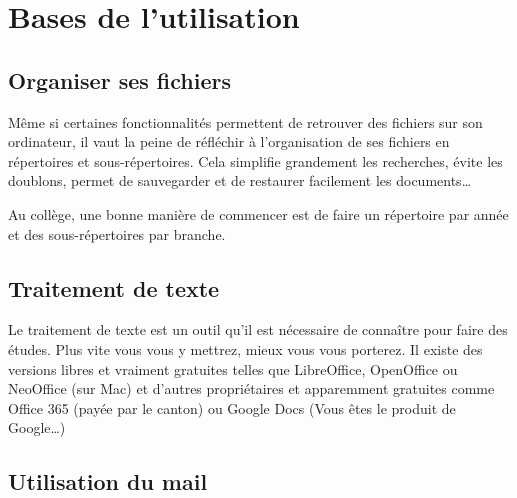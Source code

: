 \documentclass[10pt,a4paper]{report}
\begin{document}
\section{Bases de l'utilisation}



\subsection{Organiser ses fichiers}

Même si certaines fonctionnalités permettent de retrouver des fichiers sur son ordinateur, il vaut la peine de réfléchir à l'organisation de ses fichiers en répertoires et sous-répertoires. Cela simplifie grandement les recherches, évite les doublons, permet de sauvegarder et de restaurer facilement les documents\dots

Au collège, une bonne manière de commencer est de faire un répertoire par année et des sous-répertoires par branche.



\subsection{Traitement de texte}

Le traitement de texte est un outil qu'il est nécessaire de connaître pour faire des études. Plus vite vous vous y mettrez, mieux vous vous porterez. Il existe des versions libres et vraiment gratuites telles que LibreOffice, OpenOffice ou NeoOffice (sur Mac) et d'autres propriétaires et apparemment gratuites comme Office 365 (payée par le canton) ou Google Docs (Vous êtes le produit de Google\dots)




\subsection{Utilisation du mail}
\end{document}
